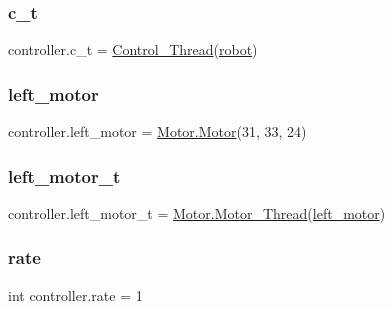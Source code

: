 \subsubsection{\texorpdfstring{c\+\_\+t}{c\_t}}
{\footnotesize\ttfamily controller.\+c\+\_\+t = \mbox{\hyperlink{classcontroller_1_1_control___thread}{Control\+\_\+\+Thread}}(\mbox{\hyperlink{namespacecontroller_a16bd60420374c0595e623e0f1706972a}{robot}})}

\mbox{\label{namespacecontroller_accafb331d0342effadbbe3609c156598}} 
\subsubsection{\texorpdfstring{left\+\_\+motor}{left\_motor}}
{\footnotesize\ttfamily controller.\+left\+\_\+motor = \mbox{\hyperlink{class_motor_1_1_motor}{Motor.\+Motor}}(31, 33, 24)}

\mbox{\label{namespacecontroller_a6d0f4d0ae0b1cc7e69b7094cec5d44e9}} 
\subsubsection{\texorpdfstring{left\+\_\+motor\+\_\+t}{left\_motor\_t}}
{\footnotesize\ttfamily controller.\+left\+\_\+motor\+\_\+t = \mbox{\hyperlink{class_motor_1_1_motor___thread}{Motor.\+Motor\+\_\+\+Thread}}(\mbox{\hyperlink{namespacecontroller_accafb331d0342effadbbe3609c156598}{left\+\_\+motor}})}

\mbox{\label{namespacecontroller_a0875b114513cfcd900f5969aa48e9e91}} 
\subsubsection{\texorpdfstring{rate}{rate}}
{\footnotesize\ttfamily int controller.\+rate = 1}

\mbox{\label{namespacecontroller_a01c7aa0aed71e493785716166c882f4f}} 
